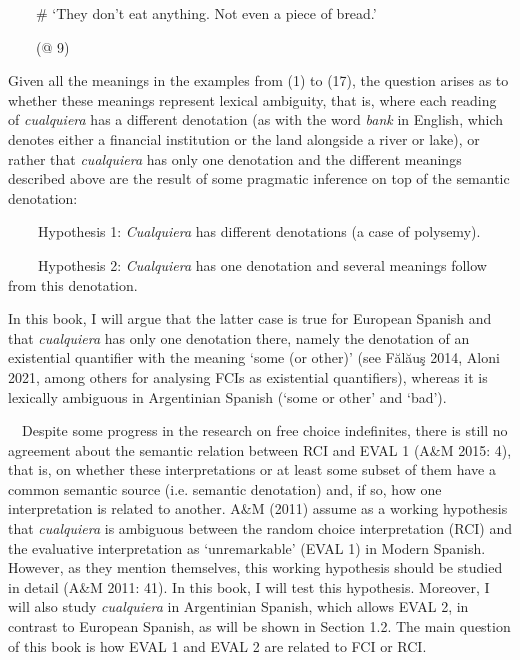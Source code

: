 \begin{styleStandard}
\ \ \ \ \# ‘They don’t eat anything. Not even a piece of bread.’
\end{styleStandard}

\begin{styleStandard}
\ \ \ \ (@ 9)
\end{styleStandard}

\begin{styleStandard}
Given all the meanings in the examples from (1) to (17), the question arises as to whether these meanings represent lexical ambiguity, that is, where each reading of \textit{cualquiera} has a different denotation (as with the word \textit{bank} in English, which denotes either a financial institution or the land alongside a river or lake), or rather that \textit{cualquiera} has only one denotation and the different meanings described above are the result of some pragmatic inference on top of the semantic denotation:
\end{styleStandard}

\begin{styleStandard}
\textbf{\ \ }\ \ Hypothesis 1: \textit{Cualquiera} has different denotations (a case of polysemy).
\end{styleStandard}

\begin{styleStandard}
\textbf{\ \ }\ \ Hypothesis 2: \textit{Cualquiera} has one denotation and several meanings follow from this denotation.
\end{styleStandard}

\begin{styleStandard}
In this book, I will argue that the latter case is true for European Spanish and that \textit{cualquiera} has only one denotation there, namely the denotation of an existential quantifier with the meaning ‘some (or other)’ (see Fălăuş 2014, Aloni 2021, among others for analysing FCIs as existential quantifiers), whereas it is lexically ambiguous in Argentinian Spanish (‘some or other’ and ‘bad’).
\end{styleStandard}

\begin{styleStandard}
\ \ Despite some progress in the research on free choice indefinites, there is still no agreement about the semantic relation between RCI and EVAL 1 (A\&M 2015: 4), that is, on whether these interpretations or at least some subset of them have a common semantic source (i.e. semantic denotation) and, if so, how one interpretation is related to another. A\&M (2011) assume as a working hypothesis that \textit{cualquiera} is ambiguous between the random choice interpretation (RCI) and the evaluative interpretation as ‘unremarkable’ (EVAL 1) in Modern Spanish. However, as they mention themselves, this working hypothesis should be studied in detail (A\&M 2011: 41). In this book, I will test this hypothesis. Moreover, I will also study \textit{cualquiera} in Argentinian Spanish, which allows EVAL 2, in contrast to European Spanish, as will be shown in Section 1.2. The main question of this book is how EVAL 1 and EVAL 2 are related to FCI or RCI. 
\end{styleStandard}


